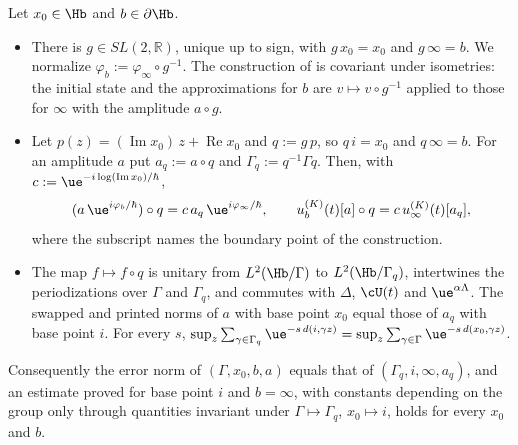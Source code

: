\begin{lemma}\label{lem:base}
Let $x_0\in\Hb$ and $b\in\partial\Hb$.
\begin{itemize}
\item[\textup{(i)}] There is $g\in SL(2,\mathbb R)$, unique up to sign, with $g\,x_0=x_0$ and $g\,\infty=b$. We normalize
$\varphi_b:=\varphi_\infty\circ g^{-1}$. The construction of \cite[(1.20)--(1.29)]{S} is covariant under isometries: the initial state and
the approximations for $b$ are $v\mapsto v\circ g^{-1}$ applied to those for $\infty$ with the amplitude $a\circ g$.
\item[\textup{(ii)}] Let $p(z)=(\operatorname{Im}x_0)\,z+\operatorname{Re}x_0$ and $q:=g\,p$, so $q\,i=x_0$ and $q\,\infty=b$. For an amplitude $a$ put
$a_q:=a\circ q$ and $\Gamma_q:=q^{-1}\Gamma q$. Then, with $c:=\ue^{-i\log(\operatorname{Im}x_0)/\hbar}$,
\[
(a\,\ue^{i\varphi_b/\hbar})\circ q=c\,a_q\,\ue^{i\varphi_\infty/\hbar},\qquad u^{(K)}_b(t)[a]\circ q=c\,u^{(K)}_\infty(t)[a_q],
\]
where the subscript names the boundary point of the construction.
\item[\textup{(iii)}] The map $f\mapsto f\circ q$ is unitary from $L^2(\Hb/\Gamma)$ to $L^2(\Hb/\Gamma_q)$, intertwines the periodizations over $\Gamma$ and
$\Gamma_q$, and commutes with $\Delta$, $\cU(t)$ and $\ue^{\alpha\Lambda}$. The swapped and printed norms of $a$ with base point $x_0$ equal those of $a_q$
with base point $i$. For every $s$, $\sup_z\sum_{\gamma\in\Gamma_q}\ue^{-s\,d(i,\gamma z)}=\sup_z\sum_{\gamma\in\Gamma}\ue^{-s\,d(x_0,\gamma z)}$.
\end{itemize}
Consequently the error norm of $(\Gamma,x_0,b,a)$ equals that of $(\Gamma_q,i,\infty,a_q)$, and an estimate proved for base point $i$ and
$b=\infty$, with constants depending on the group only through quantities invariant under $\Gamma\mapsto\Gamma_q$, $x_0\mapsto i$, holds
for every $x_0$ and $b$.
\end{lemma}

